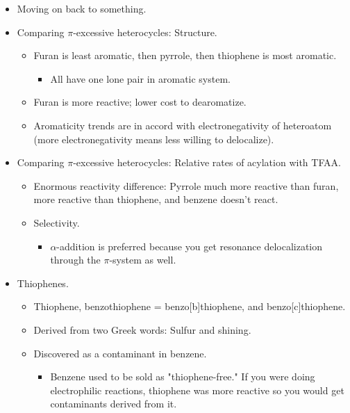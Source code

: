 \documentclass[../notes.tex]{subfiles}
\begin{document}
\begin{itemize}
\begin{itemize}
    \end{itemize}
    \item Moving on back to something.
    \item Comparing $\pi$-excessive heterocycles: Structure.
    \begin{itemize}
        \item Furan is least aromatic, then pyrrole, then thiophene is most aromatic.
        \begin{itemize}
            \item All have one lone pair in aromatic system.
        \end{itemize}
        \item Furan is more reactive; lower cost to dearomatize.
        \item Aromaticity trends are in accord with electronegativity of heteroatom (more electronegativity means less willing to delocalize).
    \end{itemize}
    \item Comparing $\pi$-excessive heterocycles: Relative rates of acylation with TFAA.
    \begin{itemize}
        \item Enormous reactivity difference: Pyrrole much more reactive than furan, more reactive than thiophene, and benzene doesn't react.
        \item Selectivity.
        \begin{itemize}
            \item $\alpha$-addition is preferred because you get resonance delocalization through the $\pi$-system as well.
        \end{itemize}
    \end{itemize}
    \item Thiophenes.
    \begin{itemize}
        \item Thiophene, benzothiophene = benzo[b]thiophene, and benzo[c]thiophene.
        \item Derived from two Greek words: Sulfur and shining.
        \item Discovered as a contaminant in benzene.
        \begin{itemize}
            \item Benzene used to be sold as "thiophene-free." If you were doing electrophilic reactions, thiophene was more reactive so you would get contaminants derived from it.
        \end{itemize}
    \end{itemize}

\end{itemize}
\end{document}
